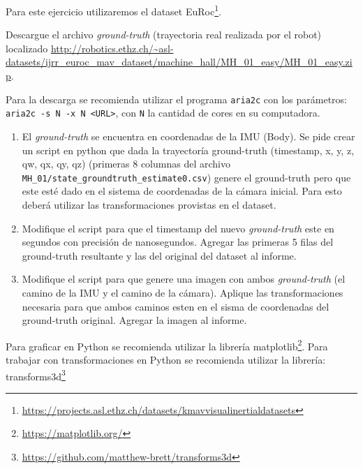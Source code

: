 \documentclass[tp]{lcc}
\begin{document}
\ejercicio Para este ejercicio utilizaremos el dataset EuRoc\footnote{\url{https://projects.asl.ethz.ch/datasets/kmavvisualinertialdatasets}}.

Descargue el archivo \emph{ground-truth} (trayectoria real realizada por el robot) localizado \url{ http://robotics.ethz.ch/~asl-datasets/ijrr_euroc_mav_dataset/machine_hall/MH_01_easy/MH_01_easy.zip}.

\begin{nota}
	Para la descarga se recomienda utilizar el programa \lstinline{aria2c} con los parámetros: \lstinline{aria2c -s N -x N <URL>}, con \lstinline{N} la cantidad de cores en su computadora.
\end{nota}

\begin{enumerate}
    \item El \emph{ground-truth} se encuentra en coordenadas de la IMU (Body). Se pide crear un script en python que dada la trayectoría ground-truth (timestamp, x, y, z, qw, qx, qy, qz) (primeras 8 columnas del archivo \lstinline{MH_01/state_groundtruth_estimate0.csv}) genere el ground-truth pero que este esté dado en el sistema de coordenadas de la cámara inicial. Para esto deberá utilizar las transformaciones provistas en el dataset.
    
    \item Modifique el script para que el timestamp del nuevo \emph{ground-truth} este en segundos con precisión de nanosegundos. Agregar las primeras 5 filas del ground-truth resultante y las del original del dataset al informe.
    
    \item Modifique el script para que genere una imagen con ambos \emph{ground-truth} (el camino de la IMU y el camino de la cámara). Aplique las transformaciones necesaria para que ambos caminos esten en el sisma de coordenadas del ground-truth original. Agregar la imagen al informe.
\end{enumerate}

\begin{nota}
	Para graficar en Python se recomienda utilizar la librería matplotlib\footnote{\url{https://matplotlib.org/}}. Para trabajar con transformaciones en Python se recomienda utilizar la librería: transforms3d\footnote{\url{https://github.com/matthew-brett/transforms3d}}
\end{nota}
\end{document}
